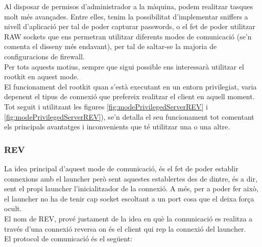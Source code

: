 Al disposar de permisos d'administrador a
la màquina, podem realitzar tasques molt més avançades. Entre elles, tenim la possibilitat d'implementar 
sniffers a nivell d'aplicació per tal de poder capturar passwords, o el fet de poder utilitzar RAW sockets que
ens permetran utilitzar diferents modes de comunicació (se'n comenta el disseny més endavant), per tal de 
saltar-se la majoria de configuracions de firewall. \\

Per tots aquests motius, sempre que sigui possible ens interessarà utilitzar el rootkit en aquest mode. \\

El funcionament del rootkit quan s'està executant en un entorn privilegiat, varia depenent el tipus de connexió
que prefereix realitzar el client en aquell moment. Tot seguit i utilitzant les figures \ref{fig:modePrivilegedServerREV} i 
\ref{fig:modePrivilegedServerREV}), se'n detalla el seu funcionament tot comentant els principals avantatges
i inconvenients que té utilitzar una o una altre. \\

\subsubsection{REV}

La idea principal d'aquest mode de comunicació, és el fet de poder establir connexions amb el launcher però sent 
aquestes establertes des de dintre, és a dir, sent el propi launcher l'inicialitzador de la connexió. A més, per a
poder fer això, el launcher no ha de tenir cap socket escoltant a un port cosa que el deixa força ocult. \\

El nom de REV, prové justament de la idea en què la comunicació es realitza a través d'una connexió reversa on 
és el client qui rep la connexió del launcher. \\

El protocol de comunicació és el següent: \\

